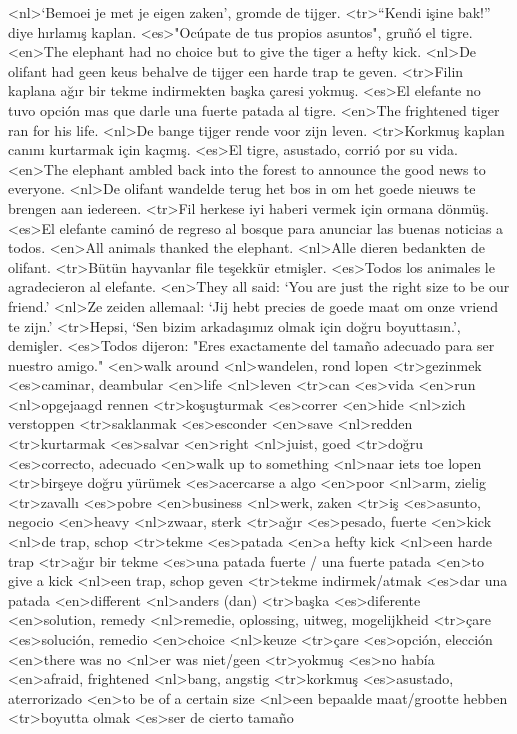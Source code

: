 <nl>`Bemoei je met je eigen zaken', gromde de tijger.  
<tr>“Kendi işine bak!” diye hırlamış kaplan. 
<es>"Ocúpate de tus propios asuntos", gruñó el tigre.
<en>The elephant had no choice but to give the tiger a hefty kick. 
<nl>De olifant had geen keus behalve de tijger een harde trap te geven.   
<tr>Filin kaplana ağır bir tekme indirmekten başka çaresi yokmuş. 
<es>El elefante no tuvo opción mas que darle una fuerte patada al tigre.
<en>The frightened tiger ran for his life. 
<nl>De bange tijger rende voor zijn leven.  
<tr>Korkmuş kaplan canını kurtarmak için kaçmış. 
<es>El tigre, asustado, corrió por su vida.
<en>The elephant ambled back into the forest to announce the good news to everyone. 
<nl>De olifant wandelde terug het  bos in om het goede nieuws te brengen aan iedereen.  
<tr>Fil herkese iyi haberi vermek için ormana dönmüş. 
<es>El elefante caminó de regreso al bosque para anunciar las buenas noticias a todos.
<en>All animals thanked the elephant.  
<nl>Alle dieren bedankten de olifant.  
<tr>Bütün hayvanlar file teşekkür etmişler. 
<es>Todos los animales le agradecieron al elefante.
<en>They all said: `You are just the right size to be our friend.'  
<nl>Ze zeiden allemaal: `Jij hebt precies de goede maat om onze vriend te zijn.'  
<tr>Hepsi, `Sen bizim arkadaşımız olmak için doğru boyuttasın.', demişler. 
<es>Todos dijeron: "Eres exactamente del tamaño adecuado para ser nuestro amigo."
<en>walk around 
<nl>wandelen, rond lopen  
<tr>gezinmek 
<es>caminar, deambular
<en>life  
<nl>leven  
<tr>can 
<es>vida
<en>run  
<nl>opgejaagd rennen  
<tr>koşuşturmak 
<es>correr 
<en>hide 
<nl>zich verstoppen  
<tr>saklanmak 
<es>esconder 
<en>save  
<nl>redden  
<tr>kurtarmak 
<es>salvar 
<en>right 
<nl>juist, goed 
<tr>doğru 
<es>correcto, adecuado
<en>walk up to something  
<nl>naar iets toe lopen  
<tr>birşeye doğru yürümek 
<es>acercarse a algo 
<en>poor  
<nl>arm, zielig 
<tr>zavallı 
<es>pobre 
<en>business  
<nl>werk, zaken  
<tr>iş 
<es>asunto, negocio
<en>heavy  
<nl>zwaar, sterk  
<tr>ağır 
<es>pesado, fuerte
<en>kick  
<nl>de trap, schop 
<tr>tekme  
<es>patada 
<en>a hefty kick  
<nl>een harde trap  
<tr>ağır bir tekme 
<es>una patada fuerte / una fuerte patada
<en>to give a kick  
<nl>een trap, schop geven  
<tr>tekme indirmek/atmak 
<es>dar una patada 
<en>different  
<nl>anders (dan)  
<tr>başka 
<es>diferente 
<en>solution, remedy  
<nl>remedie, oplossing, uitweg, mogelijkheid  
<tr>çare 
<es>solución, remedio 
<en>choice   
<nl>keuze   
<tr>çare  
<es>opción, elección
<en>there was no  
<nl>er was niet/geen  
<tr>yokmuş 
<es>no había 
<en>afraid, frightened  
<nl>bang, angstig  
<tr>korkmuş 
<es>asustado, aterrorizado
<en>to be of a certain size  
<nl>een bepaalde maat/grootte hebben  
<tr>boyutta olmak 
<es>ser de cierto tamaño
